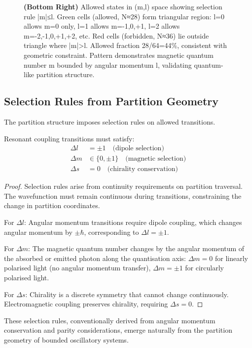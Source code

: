 \begin{figure}[htbp]
{    \textbf{(Bottom Right)} Allowed states in (m,l) space showing selection rule |m|≤l. Green cells (allowed, N≈28) form triangular region: l=0 allows m=0 only, l=1 allows m=-1,0,+1, l=2 allows m=-2,-1,0,+1,+2, etc. Red cells (forbidden, N≈36) lie outside triangle where |m|>l. Allowed fraction 28/64=44\%, consistent with geometric constraint. Pattern demonstrates magnetic quantum number m bounded by angular momentum l, validating quantum-like partition structure.}
    \label{fig:partition_traversal}
\end{figure}

\subsection{Selection Rules from Partition Geometry}

The partition structure imposes selection rules on allowed transitions.

\begin{theorem}
\label{thm:selection_rules}
Resonant coupling transitions must satisfy:
\begin{align}
\Delta l &= \pm 1 \quad \text{(dipole selection)} \\
\Delta m &\in \{0, \pm 1\} \quad \text{(magnetic selection)} \\
\Delta s &= 0 \quad \text{(chirality conservation)}
\end{align}
\end{theorem}

\begin{proof}
Selection rules arise from continuity requirements on partition traversal. The wavefunction must remain continuous during transitions, constraining the change in partition coordinates.

For $\Delta l$: Angular momentum transitions require dipole coupling, which changes angular momentum by $\pm\hbar$, corresponding to $\Delta l = \pm 1$.

For $\Delta m$: The magnetic quantum number changes by the angular momentum of the absorbed or emitted photon along the quantisation axis: $\Delta m = 0$ for linearly polarised light (no angular momentum transfer), $\Delta m = \pm 1$ for circularly polarised light.

For $\Delta s$: Chirality is a discrete symmetry that cannot change continuously. Electromagnetic coupling preserves chirality, requiring $\Delta s = 0$.
\end{proof}

These selection rules, conventionally derived from angular momentum conservation and parity considerations, emerge naturally from the partition geometry of bounded oscillatory systems.

